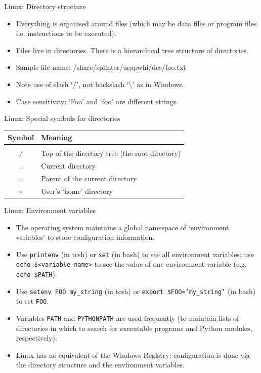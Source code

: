 \documentclass{beamer}
\begin{document}
\begin{frame}{Linux: Directory structure}
  \begin{itemize}
    \item{Everything is organised around files (which may be data files or program files i.e. instructions to be executed).}
    \item{Files live in directories. There is a hierarchical tree structure of directories.}
    \item{Sample file name: /share/splinter/ucapwhi/des/foo.txt}
    \item{Note use of slash `/', not backslash `\textbackslash' as in Windows.}
    \item{Case sensitivity: `Foo' and `foo' are different strings.}
  \end{itemize}
\end{frame}

\begin{frame}{Linux: Special symbols for directories}
  \begin{table}[ht]
    \centering
    \begin{tabular}{c l}
      \\ [-2ex]
      Symbol & Meaning \\ [.5ex]
      \hline \\ [-2ex]
      / & Top of the directory tree (the root directory) \\
      . & Current directory \\
      .. & Parent of the current directory \\
      \textasciitilde & User's `home' directory
    \end{tabular}
  \end{table}
\end{frame}


\begin{frame}{Linux: Environment variables}
  \begin{itemize}
    \item The operating system maintains a global namespace of `environment variables' to store configuration information.
    \item Use \texttt{printenv} (in tcsh) or \texttt{set} (in bash) to see all environment variables; use \texttt{echo \$<variable\_name>} to see the value of one environment variable (e.g. \texttt{echo \$PATH}).
    \item Use \texttt{setenv FOO my\_string} (in tcsh) or \texttt{export \$FOO=`my\_string'} (in bash) to set \texttt{FOO}.
    \item Variables \texttt{PATH} and \texttt{PYTHONPATH} are used frequently (to maintain lists of directories in which to search for executable programs and Python modules, respectively).
    \item Linux has no equivalent of the Windows Registry; configuration is done via the directory structure and the environment variables.
  \end{itemize}
\end{frame}
\end{document}
